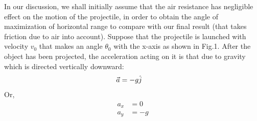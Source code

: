 \documentclass[12pt]{article}
\begin{document}
In our discussion, we shall initially assume that the air resistance has negligible effect on the motion of the projectile, in order to obtain the angle of maximization of horizontal range to compare with our final result (that takes friction due to air into account). Suppose that the projectile is launched with velocity $v_0$ that makes an angle $\theta_0$ with the x-axis as shown in Fig.1. After the object has been projected, the acceleration acting on it is that due to gravity which is directed vertically downward:
\begin{align}
  \Vec{a} &= -g\textbf{\textbf{$\hat{j}$}}  
\end{align}
Or, 
\begin{align}
a_x &= 0 \\
a_y &= -g
\end{align}
\end{document}
